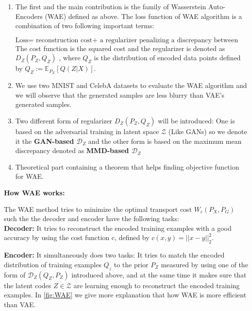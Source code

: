\documentclass[12pt,english]{amsart}
\theoremstyle{definition}
\begin{document}
\begin{enumerate}
  \item The first and the main contribution is the family of Wasserstein
        Auto-Encoders (WAE) defined as above. The loss function of WAE algorithm
        is a combination of two following important terms:

$$\text{Loss= reconstruction cost+ a regularizer penalizing a discrepancy between distributions}$$
The cost function is the squared cost and the regularizer is denoted as
$D_{Z}(P_Z, Q_Z)$ , where $Q_Z$ is the distribution of encoded data points
defined by $Q_Z:= \mathbb{E}_{P_X} \left[Q(Z|X) \right]$.

  \item We use two MNIST and CelebA datasets to evaluate the WAE algorithm and we
        will observe that the generated samples are less blurry than VAE's generated
        samples.

  \item Two different form of regularizer $D_Z(P_Z, Q_Z)$ will be introduced: One
        is based on the adversarial training in latent space $\mathcal{Z}$ (Like
        GANs) so we denote it the \textbf{ GAN-based $\mathcal{D}_Z$} and the
        other form is based on the maximum mean discrepancy denoted as
        \textbf{MMD-based $\mathcal{D}_Z $}

  \item Theoretical part containing a theorem that helps finding objective
        function for WAE.

\end{enumerate}

\textbf{How WAE works:}

The WAE method tries to minimize the optimal transport cost $W_c(P_X, P_G)$ such
the the decoder and encoder have the following tasks:\\

\textbf{Decoder:} It tries to reconstruct the encoded training examples with a
good accuracy by using the cost function c, defined by $c(x,y)= ||x-y||_2^2$.

\textbf{Encoder:} It simultaneously does two tasks: It tries to match the encoded
distribution of training examples $Q_z$ to the prior $P_Z$ measured by using one
of the form of $\mathcal{D}_Z(Q_Z,P_Z)$ introduced above, and at the same time it
makes sure that the latent codes $Z \in \mathcal{Z}$ are learning enough to
reconstruct the encoded training examples.  In \ref{fig:WAE} we give more explanation
that how WAE is more efficient than VAE.
\end{document}
